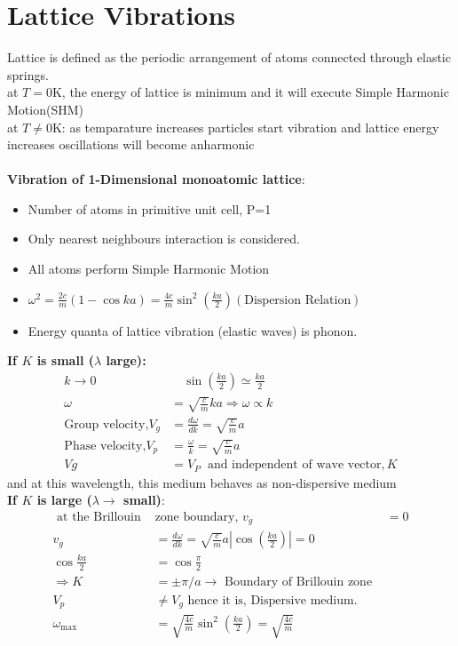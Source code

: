 \section{Lattice Vibrations}
Lattice is defined as the periodic arrangement of atoms connected through elastic springs.\\
at $T=0\text{K}$, the energy of lattice is minimum and it will execute Simple Harmonic Motion(SHM)\\
at $T\neq0\text{K}$: as temparature increases particles start vibration and lattice energy increases oscillations will become anharmonic\\\\
\textbf{Vibration of 1-Dimensional monoatomic lattice}:
\begin{itemize}
	\item Number of atoms in primitive unit cell, P=1
\item Only nearest neighbours interaction is considered.
\item All atoms perform Simple Harmonic Motion 
\item $\omega^{2}=\frac{2 c}{m}(1-\cos k a)=\frac{4 c}{m} \sin ^{2}\left(\frac{k a}{2}\right)(\text{Dispersion Relation})$
\item Energy quanta of lattice vibration (elastic waves) is phonon.
\end{itemize}
\textbf{If $K$ is small ($\lambda$ large):}
\begin{align*}
k \rightarrow 0 &\quad \sin \left(\frac{k a}{2}\right) \simeq \frac{k a}{2}\\
\omega&=\sqrt{\frac{c}{m}} k a \Rightarrow \omega \propto k\\
\text{Group velocity,}V_{g}&=\frac{d \omega}{d k}=\sqrt{\frac{c}{m}} a\\
\text{Phase velocity,}V_{p}&=\frac{\omega}{k}=\sqrt{\frac{c}{m}} a\\
V g&=V_{P} \ \text { and independent of wave vector}, K
\end{align*}
 and at this wavelength, this medium behaves as non-dispersive medium\\
\textbf{If $K$ is large ($\lambda\rightarrow$ small)}:
\begin{align*}
\text { at the Brillouin }&\text{zone boundary, } v_{g}&=0\\
v_{g}&=\frac{d \omega}{d k}=\sqrt{\frac{c}{m}} a\left|\cos \left(\frac{k a}{2}\right)\right|=0\\
\cos \frac{k a}{2}&=\cos \frac{\pi}{2}\\
\Rightarrow K&=\pm \pi / a \rightarrow \text { Boundary of Brillouin zone } \\
V_{p} &\neq V_{g} \text { hence it is, Dispersive medium. }\\
\omega_{\max }&=\sqrt{\frac{4 c}{m}} \sin ^{2}\left(\frac{k a}{2}\right)=\sqrt{\frac{4 c}{m}}
\end{align*}
